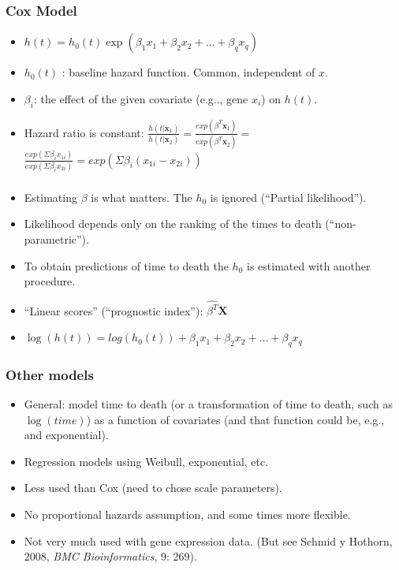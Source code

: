 \begin{frame}
\frametitle{Cox Model}
\begin{itemize}
\item $h(t) = h_0(t) \exp(\beta_1 x_1 + \beta_2 x_2 + \ldots + \beta_q x_q)$
\item $h_0(t)$ : baseline hazard function. Common, independent of 
  $x$.
\item $\beta_i$: the effect of the given covariate (e.g.., gene $x_i$) on 
  $h(t)$.
\item Hazard ratio is constant:
  $\frac{h(t|\mathbf{x}_1)}{h(t|\mathbf{x}_2)} =
  \frac{exp(\beta^T\mathbf{x}_1)}{exp(\beta^T\mathbf{x}_2)} = $
$ \frac{exp(\Sigma \beta_i x_{1i})}{exp(\Sigma \beta_i x_{2i})} = 
  exp(\Sigma \beta_i (x_{1i} - x_{2i}))$
\end{itemize}
\end{frame}


\begin{frame}
\frametitle{}
\begin{itemize}
\item Estimating $\beta$ is what matters. The $h_0$ is ignored (``Partial likelihood'').
\item Likelihood depends only on the ranking of the times to death (``non-parametric'').
\item To obtain predictions of time to death the  $h_0$ is estimated with
  another procedure.
\item ``Linear scores'' (``prognostic index''): $\hat{\beta^T}\mathbf{X}$
\item $\log(h(t)) = log(h_0(t)) + \beta_1 x_1 + \beta_2 x_2 + \ldots + \beta_q x_q$

\end{itemize}
\end{frame}




\begin{frame}
\frametitle{Other models}
\begin{itemize}
\item General: model time to death (or a transformation of time to death, such
  as $\log(time)$) as a function of covariates (and that function could
  be, e.g., and exponential).
\item Regression models using Weibull, exponential, etc.
\item Less used than Cox (need to chose scale parameters).
\item No proportional hazards assumption, and some times more flexible.
\item Not very much used with gene expression data. (But see Schmid y
  Hothorn, 2008, \textit{BMC Bioinformatics}, 9: 269).
\end{itemize}
\end{frame}



